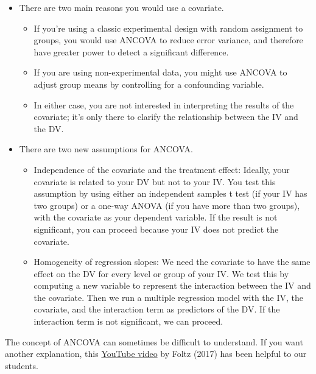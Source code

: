 \documentclass[
  letterpaper,
  DIV=11,
  numbers=noendperiod]{scrreprt}
\begin{document}
\begin{itemize}
\item
  There are two main reasons you would use a covariate.

  \begin{itemize}
  \item
    If you're using a classic experimental design with random assignment
    to groups, you would use ANCOVA to reduce error variance, and
    therefore have greater power to detect a significant difference.
  \item
    If you are using non-experimental data, you might use ANCOVA to
    adjust group means by controlling for a confounding variable.
  \item
    In either case, you are not interested in interpreting the results
    of the covariate; it's only there to clarify the relationship
    between the IV and the DV.
  \end{itemize}
\item
  There are two new assumptions for ANCOVA.

  \begin{itemize}
  \item
    Independence of the covariate and the treatment effect: Ideally,
    your covariate is related to your DV but not to your IV. You test
    this assumption by using either an independent samples t test (if
    your IV has two groups) or a one-way ANOVA (if you have more than
    two groups), with the covariate as your dependent variable. If the
    result is not significant, you can proceed because your IV does not
    predict the covariate.
  \item
    Homogeneity of regression slopes: We need the covariate to have the
    same effect on the DV for every level or group of your IV. We test
    this by computing a new variable to represent the interaction
    between the IV and the covariate. Then we run a multiple regression
    model with the IV, the covariate, and the interaction term as
    predictors of the DV. If the interaction term is not significant, we
    can proceed.
  \end{itemize}
\end{itemize}

The concept of ANCOVA can sometimes be difficult to understand. If you
want another explanation, this
\href{https://www.youtube.com/watch?v=0e8BI2u6DU0}{YouTube video} by
Foltz (2017) has been helpful to our students.

\end{document}
